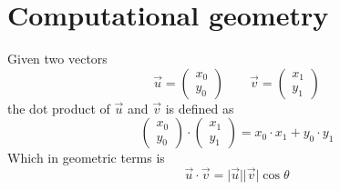 \documentclass{beamer}
\begin{document}
\section*{Computational geometry}

\begin{frame}[plain]
  \vspace{20pt}
  Given two vectors 
  \[
    \vec{u} = \begin{pmatrix} x_0 \\ y_0 \end{pmatrix} \quad\quad
    \vec{v} = \begin{pmatrix} x_1 \\ y_1 \end{pmatrix}
  \]
  the dot product of $\vec{u}$ and $\vec{v}$ is defined as 
  \[
    \begin{pmatrix} x_0 \\ y_0 \end{pmatrix} \cdot
    \begin{pmatrix} x_1 \\ y_1 \end{pmatrix} = 
    x_0 \cdot x_1 + y_0 \cdot y_1
  \]
  Which in geometric terms is
  \[
    \vec{u} \cdot \vec{v} = 
    \lvert \vec{u} \rvert \lvert \vec{v} \rvert \cos \theta
  \]
\end{frame}

\end{document}
